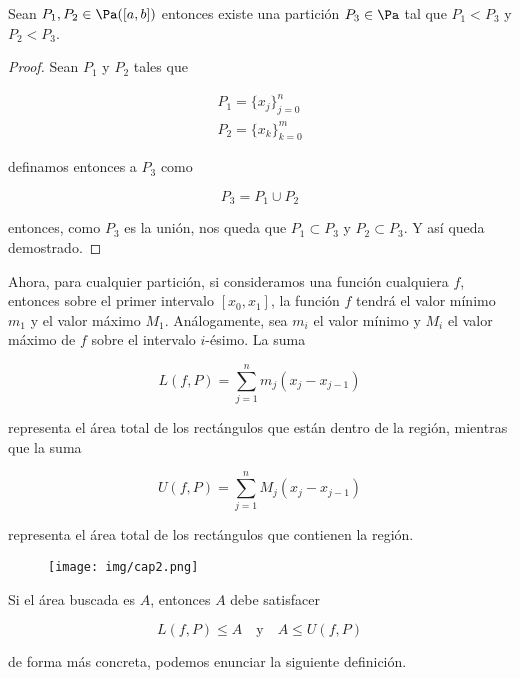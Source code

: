 \begin{pro}
    Sean $P_1, P_2 \in \Pa([a,b])$ entonces existe una partición $P_3 \in \Pa$ tal que $P_1 < P_3$ y $P_2 < P_3$.
\end{pro}

\begin{proof}
    Sean $P_1$ y $P_2$ tales que
    
    \begin{gather*}
        P_1 = \{ x_j \}_{j=0}^n \\
        P_2 = \{ x_k \}_{k=0}^m
    \end{gather*}
    
    \noindent definamos entonces a $P_3$ como
    
    \[
    P_3 = P_1 \cup P_2
    \]
    
    \noindent entonces, como $P_3$ es la unión, nos queda que $P_1 \subset P_3$ y $P_2 \subset P_3$. Y así queda demostrado.
\end{proof}

Ahora, para cualquier partición, si consideramos una función cualquiera $f$, entonces sobre el primer intervalo $[x_0, x_1]$, la función $f$ tendrá el valor mínimo $m_1$ y el valor máximo $M_1$. Análogamente, sea $m_i$ el valor mínimo y $M_i$ el valor máximo de $f$ sobre el intervalo $i$-ésimo. La suma

\[
L(f, P) = \sum_{j=1}^n m_j(x_j - x_{j-1})
\]

\noindent representa el área total de los rectángulos que están dentro de la región, mientras que la suma

\[
U(f, P) = \sum_{j=1}^n M_j(x_j - x_{j-1})
\]

\noindent representa el área total de los rectángulos que contienen la región.

\begin{figure}[h]
    \centering
    \texttt{[image: img/cap2.png]}
    \label{fig:areamM}
\end{figure}

Si el área buscada es $A$, entonces $A$ debe satisfacer

\[
L(f, P) \leq A \quad \text{y} \quad A \leq U(f, P)
\]

\noindent de forma más concreta, podemos enunciar la siguiente definición.

